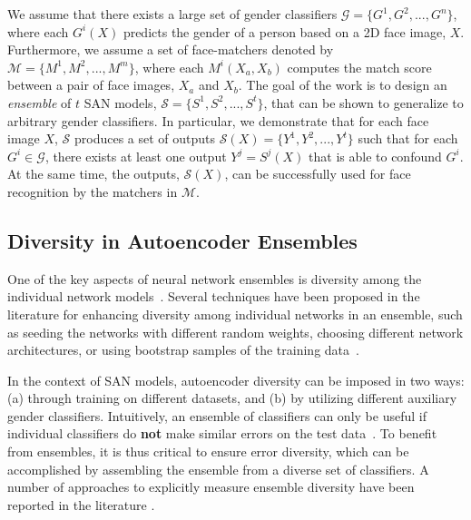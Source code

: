 \documentclass[10pt,twocolumn,letterpaper]{article}
\begin{document}
We assume that there exists a large set of gender classifiers $\mathcal{G}=\{G^1, G^2, ..., G^n\}$, where each $G^i(X)$ predicts the gender of a person based on a 2D face image, $X$. Furthermore, we assume a set of face-matchers denoted by $\mathcal{M}=\{M^1, M^2, ..., M^m\}$, where each $M^i(X_a, X_b)$ computes the match score between a pair of face images, $X_a$ and $X_b$. 
The goal of the work is to design an {\em ensemble} of $t$ SAN models, $\mathcal{S} = \{S^1, S^2, ..., S^t\}$, that can be shown to generalize to arbitrary gender classifiers. In particular, we demonstrate that for each face image $X$, $\mathcal{S}$ produces a set of outputs $\mathcal{S}(X) = \{Y^1, Y^2, ..., Y^t\}$ such that for each $G^i\in \mathcal{G}$, there exists at least one output $Y^j = S^j(X)$ that is able to confound $G^i$. At the same time, the outputs, $\mathcal{S}(X)$, can be successfully used for face recognition by the matchers in $\mathcal{M}$. 

\subsection{Diversity in Autoencoder Ensembles}

One of the key aspects of neural network ensembles is diversity among the individual network models~\cite{hansen_neural_1990}. Several techniques have been proposed in the literature for enhancing diversity among individual networks in an ensemble, such as seeding the networks with different random weights, choosing different network architectures, or using bootstrap samples of the training data~\cite{strauss_ensemble_2017,dietterich_ensemble_2000}.

In the context of SAN models, autoencoder diversity can be imposed in two ways: (a) through training on different datasets, and (b) by utilizing different auxiliary gender classifiers. %
Intuitively, an ensemble of classifiers can only be useful if individual classifiers do {\bf not} make similar errors on the test data~\cite{strauss_ensemble_2017, hansen_neural_1990, kuncheva_combining_2004}.
To benefit from ensembles, it is thus critical to ensure error diversity, which can be accomplished by assembling the ensemble from a diverse set of classifiers. A number of approaches to explicitly measure ensemble diversity have been reported in the literature \cite{kuncheva_combining_2004}.
\end{document}
